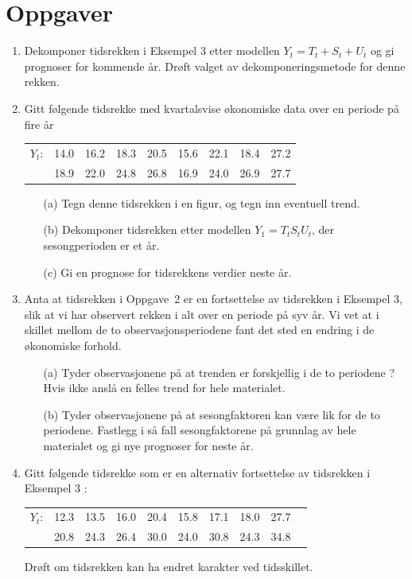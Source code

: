 \section{Oppgaver}
\small
\begin{enumerate}
\item Dekomponer tidsrekken i Eksempel 3 etter modellen $Y_t = T_t + S_t +
U_t$ og gi prognoser for kommende år.  Drøft valget av 
dekomponeringsmetode for denne rekken.

\item Gitt følgende tidsrekke med kvartalsvise økonomiske data over
en periode på fire år 
\begin{center}
\begin{tabular}{lcccccccc}
 $Y_t$: &  14.0  &  16.2  &  18.3  &  20.5  &  15.6  &  22.1  &  18.4 & 27.2 \\
     &  18.9  &  22.0  &  24.8  &  26.8  &  16.9  &  24.0  &  26.9  &  27.7
\end{tabular} 
\end{center}
\begin{itemize}
\item[(a)] Tegn denne tidsrekken i en figur, og tegn inn eventuell trend.
\item[(b)] Dekomponer tidsrekken etter modellen $Y_1 = T_tS_tU_t$, der
           sesongperioden er et år.
\item[(c)] Gi en prognose for tidsrekkens verdier neste år.
\end{itemize}
\item  Anta at tidsrekken i Oppgave~2 er en fortsettelse av tidsrekken i
 Eksempel 3, slik at vi har observert rekken i alt over en periode på syv
 år. Vi vet at i skillet mellom de to observasjonsperiodene fant det sted
 en endring i de økonomiske forhold.  
\begin{itemize}
\item[(a)] Tyder observasjonene på at trenden er forskjellig i de to 
         periodene ?  Hvis ikke anslå en felles trend for hele materialet.
\item[(b)] Tyder observasjonene på at sesongfaktoren kan være lik for
   de to periodene.  Fastlegg i så fall sesongfaktorene på grunnlag av
    hele materialet og gi nye prognoser for neste år.
\end{itemize}
\item Gitt følgende tidsrekke som er en alternativ fortsettelse av
      tidsrekken i Eksempel 3 : 
\begin{center}
\begin{tabular}{lccccccccc}
 $Y_t$: &  12.3  &  13.5  &  16.0  &  20.4  &  15.8  &  17.1  &  18.0  & 27.7\\
     &  20.8  &  24.3  &  26.4  &  30.0  &  24.0  &  30.8  &  24.3  &  34.8
\end{tabular}
\end{center}
Drøft om tidsrekken kan ha endret karakter ved tidsskillet.


\end{enumerate}
